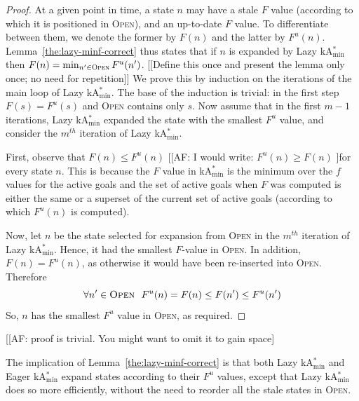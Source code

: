 \documentclass[twoside,11pt]{article}
\newcommand{\kastarvar}[1]{\textup{kA}$^*_{#1}$\xspace}
\newcommand{\kastarmin}{\kastarvar{\min}}
\newcommand{\open}{\textsc{Open}\xspace}
\begin{document}
\begin{proof}

At a given point in time, a state $n$ may have a stale $F$ value (according to which it is positioned in \open), and an up-to-date $F$ value.
To differentiate between them, we denote the former by $F(n)$ and the latter by $F^u(n)$.
Lemma~\ref{the:lazy-minf-correct} thus states that if $n$ is expanded by Lazy \kastarmin then $F(n)=\min_{n'\in \open}F^u(n')$. [[Define this once and present the lemma only once; no need for repetition]]
We prove this by induction on the iterations of the main loop of Lazy \kastarmin.
The base of the induction is trivial: in the first step $F(s)=F^u(s)$ and \open contains only $s$.
Now assume that in the first $m-1$ iterations, Lazy \kastarmin expanded the state with the smallest $F^u$ value, and consider the $m^{th}$ iteration of Lazy \kastarmin.

First, observe that $F(n)\leq F^u(n)$ [[AF: I would write: $F^u(n)\geq F(n)$ ]for every state $n$.
This is because the $F$ value in \kastarmin is the minimum over the $f$ values for the active goals and the set of active goals when $F$ was computed is either the same or a superset of the current set of active goals (according to which $F^u(n)$ is computed).

Now, let $n$ be the state selected for expansion from \open in the $m^{th}$ iteration of Lazy \kastarmin. Hence, it had the smallest $F$-value in \open.
In addition, $F(n)=F^u(n)$, as otherwise it would have been re-inserted into \open.
Therefore
\[ \forall n'\in\open ~~ F^u(n)=F(n)\leq F(n') \leq F^u(n') \]
  So, $n$ has the smallest $F^u$ value in \open, as required.
\end{proof}

[[AF: proof is trivial. You might want to omit it to gain space]

The implication of Lemma~\ref{the:lazy-minf-correct} is that both Lazy \kastarmin and Eager \kastarmin expand states according to their $F^u$ values, except that Lazy \kastarmin does so more efficiently, without the need to reorder all the stale states in \open.
\end{document}
